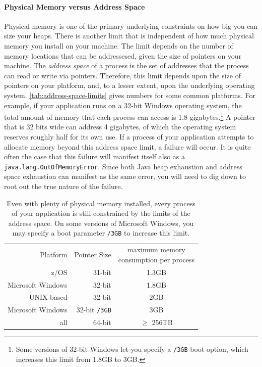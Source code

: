 \paragraph{Physical Memory versus Address Space}
\label{sec:address-space}
Physical memory is one of the primary underlying constraints on how big you can
size your heaps. There is another limit that is independent of how much physical
memory you install on your machine. The limit depends on the number of memory
locations that can be addressesed, given the size of pointers on your machine.
The \emph{address space} of a process is the set of addresses that the process
can read or write via pointers. Therefore, this limit depends upon the size of
pointers on your platform, and, to a lesser extent, upon the underlying
operating system. \autoref{tab:address-space-limits} gives numbers for
some common platforms. For example, if your application runs on a 32-bit Windows
operating system, the total amount of memory that each process can access is 1.8
gigabytes.\footnote{Some versions of 32-bit Windows let you specify a {\tt /3GB}
boot option, which increases this limit from 1.8GB to 3GB.} A pointer that is 32
bits wide can address 4 gigabytes, of which the operating system reserves
roughly half for its own use. If a process of your application attempts to
allocate memory beyond this address space limit, a failure will occur. It is
quite often the case that this failure will manifest itself also as a
{\tt java.lang.OutOfMemoryError}. 
Since both Java heap exhaustion and address space exhaustion can manifest as the
same error, you will need to dig down to root out the true nature of the
failure.

\begin{table}
\centering
\begin{tabular}{rrc}
\toprule
Platform & Pointer Size & \shortstack{maximum memory\\consumption per process}
\\ \cmidrule(r){1-2} \cmidrule(l){3-3}
z/OS & 31-bit & 1.3GB \\
Microsoft Windows & 32-bit & 1.8GB \\
UNIX-based & 32-bit & 2GB \\
Microsoft Windows & 32-bit {\tt /3GB} & 3GB \\
all & 64-bit & $\ge$ 256TB \\
\bottomrule
\end{tabular}
\caption{Even with plenty of physical memory installed, every process of your
application is still constrained 
  by the limits of the address space. On some versions of Microsoft Windows, you
  may specify a boot parameter {\tt /3GB} to increase this limit.}
\label{tab:address-space-limits}
\end{table}

